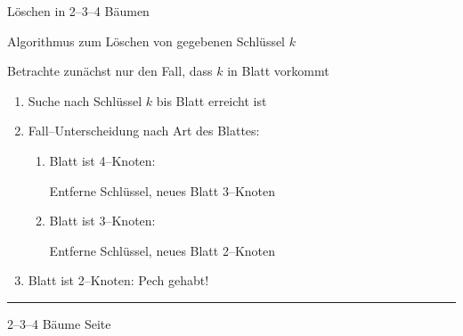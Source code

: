 \begin{slide}{}
\normalsize

\begin{center}
L\"oschen in 2--3--4 B\"aumen
\end{center}
\vspace*{0.5cm}

\footnotesize
Algorithmus zum L\"oschen von gegebenen Schl\"ussel $k$

Betrachte zun\"achst nur den Fall, dass $k$ in Blatt vorkommt
\begin{enumerate}
\item Suche nach Schl\"ussel $k$ bis Blatt erreicht ist

\item Fall--Unterscheidung nach Art des Blattes:
      \begin{enumerate}
      \item Blatt ist 4--Knoten: 
    
            
            Entferne Schl\"ussel, neues Blatt 3--Knoten

             \raisebox{2.4cm}{l\"osche 7} 
    

      \item Blatt ist 3--Knoten: 

            Entferne Schl\"ussel, neues Blatt 2--Knoten

             \raisebox{2.4cm}{l\"osche 1} 


      \end{enumerate}
      \item Blatt ist 2--Knoten: Pech gehabt!
\end{enumerate}

\vspace*{\fill}
\tiny \addtocounter{mypage}{1}
\rule{17cm}{1mm}
2--3--4 B\"aume  \hspace*{\fill} Seite 
\end{slide}


